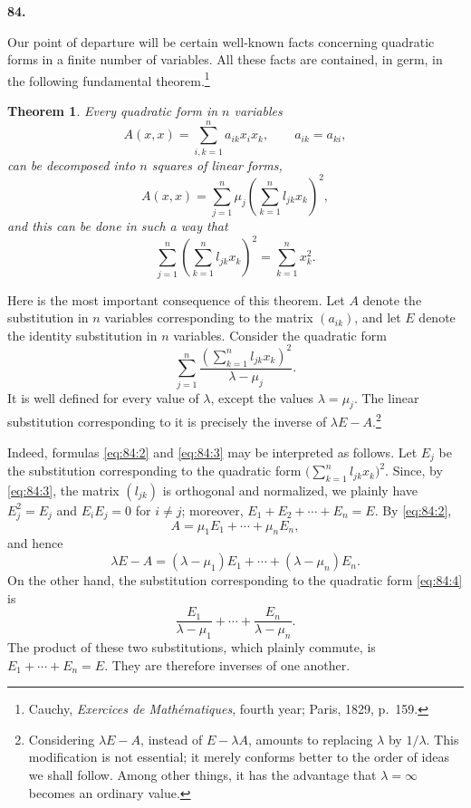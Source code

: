 \documentclass[
  paper=b5,
  fontsize=13pt,
  twoside=true,
  open=any,
  bookmarkpackage=false,
  chapterprefix=true,
  headings=normal
]{scrbook}
\newtheorem*{theorem}{Theorem}
\theoremstyle{definition}
\newcommand{\numberedparagraph}[1]{%
  \par\medskip\phantomsection\label{sec:#1}%
  \noindent\textbf{#1.}\enspace
}
\begin{document}
\numberedparagraph{84}
Our point of departure will be certain well-known facts concerning quadratic
forms in a finite number of variables.  All these facts are contained, in germ,
in the following fundamental theorem.\footnote{Cauchy, \emph{Exercices de
Mathématiques}, fourth year; Paris, 1829, p.~159.}

\begin{theorem}
Every quadratic form in \(n\) variables
\begin{equation}
  A(x,x)=\sum_{i,k=1}^{n}a_{ik}x_ix_k,
  \qquad a_{ik}=a_{ki},
  \tag{1}\label{eq:84:1}
\end{equation}
can be decomposed into \(n\) squares of linear forms,
\begin{equation}
  A(x,x)=\sum_{j=1}^{n}\mu_j
  \left(\sum_{k=1}^{n}l_{jk}x_k\right)^2,
  \tag{2}\label{eq:84:2}
\end{equation}
and this can be done in such a way that
\begin{equation}
  \sum_{j=1}^{n}\left(\sum_{k=1}^{n}l_{jk}x_k\right)^2
  =\sum_{k=1}^{n}x_k^2.
  \tag{3}\label{eq:84:3}
\end{equation}
\end{theorem}

Here is the most important consequence of this theorem.  Let \(A\) denote the
substitution in \(n\) variables corresponding to the matrix \((a_{ik})\), and
let \(E\) denote the identity substitution in \(n\) variables.  Consider the
quadratic form
\begin{equation}
  \sum_{j=1}^{n}
  \frac{\left(\sum_{k=1}^{n}l_{jk}x_k\right)^2}{\lambda-\mu_j}.
  \tag{4}\label{eq:84:4}
\end{equation}
It is well defined for every value of \(\lambda\), except the values
\(\lambda=\mu_j\).  The linear substitution corresponding to it is precisely
the inverse of \(\lambda E-A\).\footnote{Considering \(\lambda E-A\), instead
of \(E-\lambda A\), amounts to replacing \(\lambda\) by \(1/\lambda\).  This
modification is not essential; it merely conforms better to the order of ideas
we shall follow.  Among other things, it has the advantage that
\(\lambda=\infty\) becomes an ordinary value.}

Indeed, formulas \eqref{eq:84:2} and \eqref{eq:84:3} may be interpreted as
follows.  Let \(E_j\) be the substitution corresponding to the quadratic form
\(\bigl(\sum_{k=1}^{n}l_{jk}x_k\bigr)^2\).  Since, by
\eqref{eq:84:3}, the matrix \((l_{jk})\)
is orthogonal and normalized, we plainly have \(E_j^2=E_j\) and
\(E_iE_j=0\) for \(i\ne j\); moreover,
\(E_1+E_2+\cdots+E_n=E\).  By \eqref{eq:84:2},
\[
  A=\mu_1E_1+\cdots+\mu_nE_n,
\]
and hence
\[
  \lambda E-A=(\lambda-\mu_1)E_1+\cdots+(\lambda-\mu_n)E_n.
\]
On the other hand, the substitution corresponding to the quadratic form
\eqref{eq:84:4} is
\[
  \frac{E_1}{\lambda-\mu_1}+\cdots+
  \frac{E_n}{\lambda-\mu_n}.
\]
The product of these two substitutions, which plainly commute, is
\(E_1+\cdots+E_n=E\).  They are therefore inverses of one another.
\end{document}
